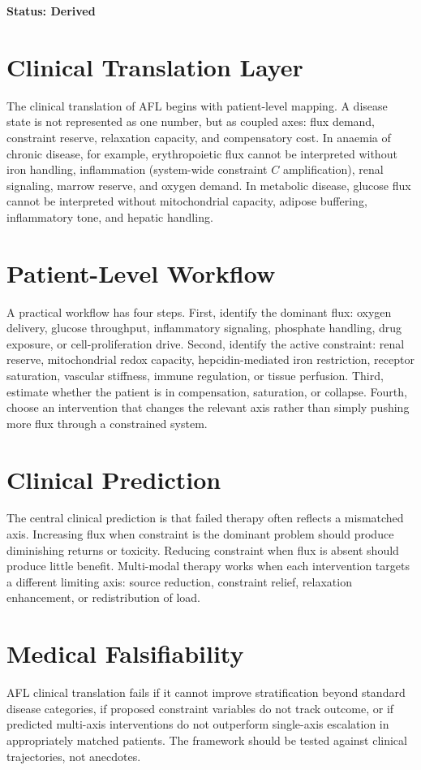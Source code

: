 \documentclass[11pt]{article}
\begin{document}
\textbf{Status: Derived}


\section{Clinical Translation Layer}
The clinical translation of AFL begins with patient-level mapping. A disease state is not represented as one number, but as coupled axes: flux demand, constraint reserve, relaxation capacity, and compensatory cost. In anaemia of chronic disease, for example, erythropoietic flux cannot be interpreted without iron handling, inflammation (system-wide constraint $C$ amplification), renal signaling, marrow reserve, and oxygen demand. In metabolic disease, glucose flux cannot be interpreted without mitochondrial capacity, adipose buffering, inflammatory tone, and hepatic handling.

\section{Patient-Level Workflow}
A practical workflow has four steps. First, identify the dominant flux: oxygen delivery, glucose throughput, inflammatory signaling, phosphate handling, drug exposure, or cell-proliferation drive. Second, identify the active constraint: renal reserve, mitochondrial redox capacity, hepcidin-mediated iron restriction, receptor saturation, vascular stiffness, immune regulation, or tissue perfusion. Third, estimate whether the patient is in compensation, saturation, or collapse. Fourth, choose an intervention that changes the relevant axis rather than simply pushing more flux through a constrained system.

\section{Clinical Prediction}
The central clinical prediction is that failed therapy often reflects a mismatched axis. Increasing flux when constraint is the dominant problem should produce diminishing returns or toxicity. Reducing constraint when flux is absent should produce little benefit. Multi-modal therapy works when each intervention targets a different limiting axis: source reduction, constraint relief, relaxation enhancement, or redistribution of load.

\section{Medical Falsifiability}
AFL clinical translation fails if it cannot improve stratification beyond standard disease categories, if proposed constraint variables do not track outcome, or if predicted multi-axis interventions do not outperform single-axis escalation in appropriately matched patients. The framework should be tested against clinical trajectories, not anecdotes.
\end{document}
